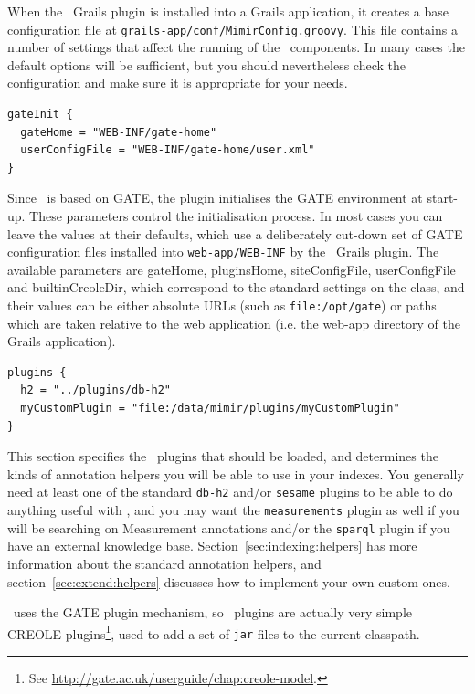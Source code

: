 When the \Mimir\ Grails plugin is installed into a Grails application, it
creates a base configuration file at {\tt grails-app/conf/MimirConfig.groovy}.
This file contains a number of settings that affect the running of the \Mimir\
components. In many cases the default options will be sufficient, but you should
nevertheless check the configuration and make sure it is appropriate for your
needs.

\begin{lstlisting}
gateInit {
  gateHome = "WEB-INF/gate-home"
  userConfigFile = "WEB-INF/gate-home/user.xml"
}
\end{lstlisting}

Since \Mimir\ is based on GATE, the plugin initialises the GATE environment at
start-up.  These parameters control the initialisation process.  In most cases
you can leave the values at their defaults, which use a deliberately cut-down
set of GATE configuration files installed into {\tt web-app/WEB-INF} by the
\Mimir\ Grails plugin.  The available parameters are gateHome, pluginsHome,
siteConfigFile, userConfigFile and builtinCreoleDir, which correspond to the
standard settings on the
class, and their values can be either absolute URLs (such as
\verb|file:/opt/gate|) or paths which are taken relative to the web application
(i.e. the web-app directory of the Grails application).

\begin{lstlisting}
plugins {
  h2 = "../plugins/db-h2"
  myCustomPlugin = "file:/data/mimir/plugins/myCustomPlugin"
}
\end{lstlisting}

This section specifies the \Mimir\ plugins that should be loaded, and
determines the kinds of annotation helpers you will be able to use in your
indexes.  You generally need at least one of the standard {\tt db-h2} and/or
{\tt sesame} plugins to be able to do anything useful with \Mimir, and you may
want the {\tt measurements} plugin as well if you will be searching on
Measurement annotations and/or the {\tt sparql} plugin if you have an external
knowledge base.  Section~\ref{sec:indexing:helpers} has more information about
the standard annotation helpers, and section~\ref{sec:extend:helpers} discusses
how to implement your own custom ones.

\Mimir\ uses the GATE plugin mechanism, so \Mimir\ plugins are actually
very simple CREOLE plugins\footnote{See
\url{http://gate.ac.uk/userguide/chap:creole-model}.}, used to add a set of
{\tt jar} files to the current classpath.
 
